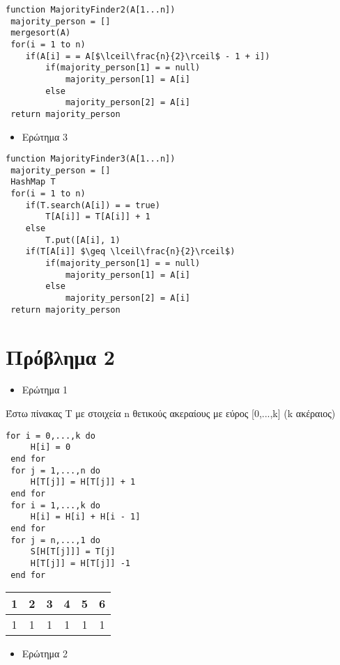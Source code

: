 \documentclass[a4paper]{article}
\begin{document}
\pagebreak

\begin{lstlisting}[mathescape]
function MajorityFinder2(A[1...n])
 majority_person = []
 mergesort(A)
 for(i = 1 to n)
 	if(A[i] = = A[$\lceil\frac{n}{2}\rceil$ - 1 + i])
 		if(majority_person[1] = = null)
 			majority_person[1] = A[i]
 		else
 			majority_person[2] = A[i]
 return majority_person
\end{lstlisting}

\begin{itemize}
\item Ερώτημα 3
\end{itemize}

\begin{lstlisting}[mathescape]
function MajorityFinder3(A[1...n])
 majority_person = []
 HashMap T
 for(i = 1 to n)
 	if(T.search(A[i]) = = true)
 		T[A[i]] = T[A[i]] + 1
 	else 
 		T.put([A[i], 1)
 	if(T[A[i]] $\geq \lceil\frac{n}{2}\rceil$)
 		if(majority_person[1] = = null)
 			majority_person[1] = A[i]
 		else
 			majority_person[2] = A[i]
 return majority_person
\end{lstlisting}

\section*{Πρόβλημα 2}

\begin{itemize}
\item Ερώτημα 1
\end{itemize}

\lstset{frame=none}
\begin{tcolorbox}[colback=blue!20!white,colframe=purple!60!white,title=\textbf{Algorithm 1}]
Έστω πίνακας T με στοιχεία n θετικούς ακεραίους με εύρος [0,...,k] (k ακέραιος)
\begin{lstlisting}[mathescape]
 for i = 0,...,k do
	 H[i] = 0
 end for
 for j = 1,...,n do
	 H[T[j]] = H[T[j]] + 1
 end for
 for i = 1,...,k do
	 H[i] = H[i] + H[i - 1]
 end for
 for j = n,...,1 do
	 S[H[T[j]]] = T[j]
	 H[T[j]] = H[T[j]] -1
 end for
\end{lstlisting}
\end{tcolorbox}

\begin{tabular}{|c|c|c|c|c|c|}
1 & 2 & 3 & 4 & 5 & 6\\
\hline
1 & 1 & 1 & 1 & 1 & 1\\\hline
\end{tabular}


\begin{itemize}
\item Ερώτημα 2
\end{itemize}
\begin{lstlisting}[mathescape]

 \end{lstlisting}
\end{document}
